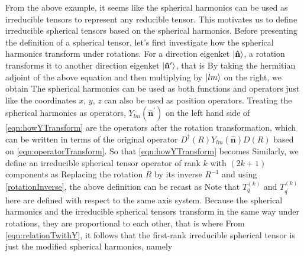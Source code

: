 From  the above example, it seems like the spherical harmonics can be 
used as irreducible tensors to represent any reducible tensor. This motivates us to define irreducible spherical
tensors based on the spherical harmonics. Before presenting the definition of a spherical tensor, let's first investigate
how the spherical harmonics transform under rotations. For a direction eigenket $|   \mathbf{\hat{n}}   \rangle$, a rotation 
transforms it to another direction eigenket $|   \mathbf{\hat{n }^{\prime} }   \rangle$, that is
By taking the hermitian adjoint of the above equation and then multiplying by $| l m \rangle$ on the right, we obtain
The spherical harmonics can be used as both functions and operators just like the coordinates $x$, $y$, $z$ can also 
be used as position operators. Treating the spherical harmonics as operators, $Y_{lm}(\mathbf{\hat{n}^{\prime} })$ on
 the left hand side of \autoref{eqn:howYTransform} are the operators after the rotation transformation, which can be written in terms of  
the original operator $D^{\dagger}(R) Y_{lm}(\mathbf{\hat{n} }) D(R)$ based on \autoref{eqn:operatorTransform}. 
So that \autoref{eqn:howYTransform} becomes
Similarly, we define an irreducible spherical tensor operator of rank $k$ with $(2 k + 1)$ components as
Replacing the rotation $R$ by its inverse $R^{-1}$ and using \autoref{rotationInverse}, the above definition can be recast as 
Note that $T_{q}^{(k)} $ and $T_{q^{\prime}}^{(k)}$ here are defined with respect to the same 
axis system. Because the spherical harmonics and the irreducible spherical tensors transform in the same way under 
rotations, they are proportional to each other, that is\cite{zare-book}
where 
From \autoref{eqn:relationTwithY}, it follows that the first-rank irreducible spherical tensor is just the modified 
spherical harmonics, namely


